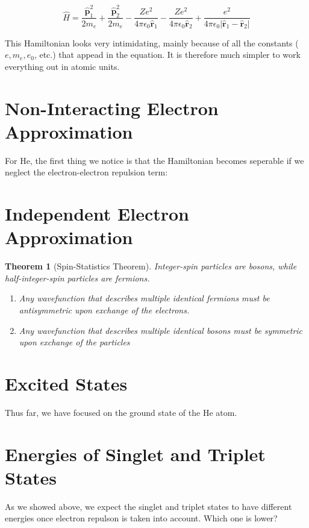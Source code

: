 \documentclass[a4paper]{tufte-handout}
\newtheorem{theorem}{Theorem}
\theoremstyle{definition}
\begin{document}
\begin{equation}
  \hat{H} = \frac{\hat{\mathbf{p}}_1^2}{2m_e} + \frac{\hat{\mathbf{p}}_2^2}{2m_e} - \frac{Ze^2}{4\pi\epsilon_0 \hat{\mathbf{r}}_1} - \frac{Ze^2}{4\pi\epsilon_0 \hat{\mathbf{r}}_2} + \frac{e^2}{4\pi\epsilon_0 | \hat{\mathbf{r}}_1 - \hat{\mathbf{r}}_2|}
\end{equation} 

This Hamiltonian looks very intimidating, mainly because of all the constants ($e, m_e, e_0$, etc.) that appead in the equation. It is therefore
much simpler to work everything out in atomic units.

\section{Non-Interacting Electron Approximation}

For He, the first thing we notice is that the Hamiltonian becomes seperable if we neglect the
electron-electron repulsion term:

\section{Independent Electron Approximation}

\begin{theorem}[Spin-Statistics Theorem] Integer-spin particles are bosons, while half-integer-spin particles are fermions.
  \begin{enumerate}
    \item Any wavefunction that describes multiple identical fermions must be antisymmetric upon exchange of the electrons.
    \item Any wavefunction that describes multiple identical bosons must be symmetric upon exchange of the particles
  \end{enumerate}
   
\end{theorem}

\section*{Excited States}

Thus far, we have focused on the ground state of the He atom.

\section{Energies of Singlet and Triplet States}
As we showed above, we expect the singlet and triplet states to have different energies once electron repulson is taken into account. Which one is lower?
\end{document}
